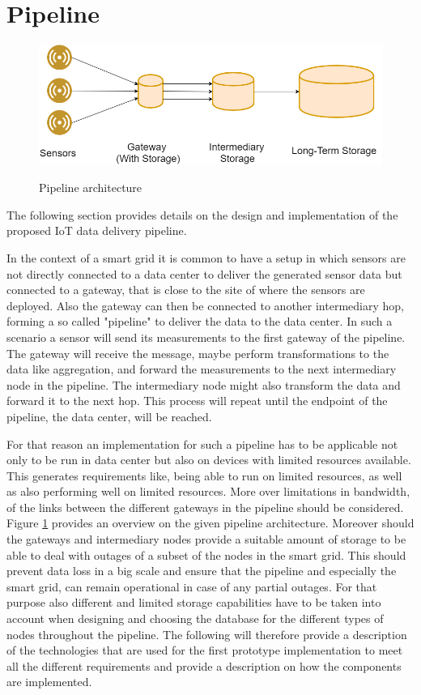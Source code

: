 \section{Pipeline}

\begin{figure}[h]
\centering
\includegraphics[width=\textwidth]{figures/pipeline.png}\\
\caption{Pipeline architecture}
\label{pipeline}
\end{figure}
The following section provides details on the design and implementation of the proposed IoT data delivery pipeline. 

In the context of a smart grid it is common to have a setup in which sensors are not directly connected to a data center to deliver the generated sensor data but connected to a gateway, that is close to the site of where the sensors are deployed. Also the gateway can then be connected to another intermediary hop, forming a so called "pipeline" to deliver the data to the data center. In such a scenario a sensor will send its measurements to the first gateway of the pipeline. The gateway will receive the message, maybe perform transformations to the data like aggregation, and forward the measurements to the next intermediary node in the pipeline. The intermediary node might also transform the data and forward it to the next hop. This process will repeat until the endpoint of the pipeline, the data center, will be reached. 

For that reason an implementation for such a pipeline has to be applicable not only to be run in data center but also on devices with limited resources available. This generates requirements like, being able to run on limited resources, as well as also performing well on limited resources. More over limitations in bandwidth, of the links between the different gateways in the pipeline should be considered.
Figure \ref{pipeline} provides an overview on the given pipeline architecture. Moreover should the gateways and intermediary nodes provide a suitable amount of storage to be able to deal with outages of a subset of the nodes in the smart grid. This should prevent data loss in a big scale and ensure that the pipeline and especially the smart grid, can remain operational in case of any partial outages. For that purpose also different and limited storage capabilities have to be taken into account when designing and choosing the database for the different types of nodes throughout the pipeline. The following will therefore provide a description of the technologies that are used for the first prototype implementation to meet all the different requirements and provide a description on how the components are implemented.


